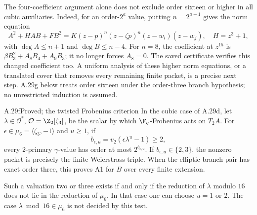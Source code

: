 The four-coefficient argument alone does not exclude order sixteen
or higher in all cubic auxiliaries. Indeed, for
an order-$2^a$ value, putting $n=2^{a-1}$ gives
the norm equation
\[
 A^2+HAB+FB^2
   =K(z-p)^n(z-\zeta p)^n(z-w_i)(z-w_j),
 \quad H=z^3+1,
\]
with $\deg A\le n+1$ and $\deg B\le n-4$.
For $n=8$, the coefficient at $z^{15}$ is
$\beta B_3^2+A_8B_4+A_9B_3$; it no longer
forces $A_8=0$. The saved certificate verifies
this changed coefficient too. A uniform analysis
of these higher norm equations, or a translated
cover that removes every remaining finite packet,
is a precise next step. A.29g below treats order sixteen
under the order-three branch hypothesis; no unrestricted induction
is assumed.

\begin{claim}{A.29f}{Proved; the twisted Frobenius criterion}
In the cubic case of A.29d, let $\lambda\in\mathcal O^*$,
$\mathcal O=\Z_2[\zeta_3]$, be the scalar by which
$\F_q$-Frobenius acts on $T_2A$. For
$\epsilon\in\mu_6=\langle\zeta_3,-1\rangle$ and $u\ge1$,
if
\[
 b_{\epsilon,u}=v_2(\epsilon\lambda^u-1)\ge2,
\]
every $2$-primary $\gamma$-value has order at most
$2^{b_{\epsilon,u}}$. If $b_{\epsilon,u}\in\{2,3\}$,
the nonzero packet is precisely the finite Weierstrass
triple. When the elliptic branch pair has exact order
three, this proves A1 for $B$ over every finite extension.

Such a valuation two or three exists if and only if
the reduction of $\lambda$ modulo $16$ does not lie
in the reduction of $\mu_6$. In that case one can
choose $u=1$ or $2$. The case
$\lambda\bmod16\in\mu_6$ is not decided by this test.
\end{claim}
